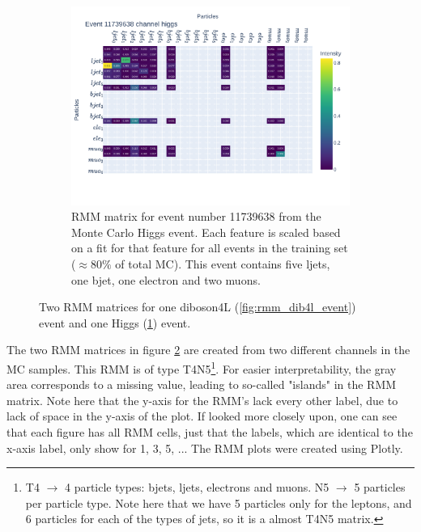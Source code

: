\begin{figure}[h!]
\begin{subfigure}{.8\textwidth}
        \includegraphics[width=\textwidth]{Figures/rmms/rmm_event_11739638_higgs.pdf}
        \caption{ RMM matrix for event number 11739638 from the Monte Carlo Higgs event. Each feature is scaled based on a fit for that feature for 
        all events in the training set ($\approx 80\%$ of total MC). This event contains five ljets, one bjet, one electron and two muons. }
        \label{fig:rmm_higgs_event}
    \end{subfigure}
    \hfill        
    \caption[Single event RMM plot]{Two RMM matrices for one diboson4L (\ref{fig:rmm_dib4l_event}) event and one Higgs (\ref{fig:rmm_higgs_event}) event.}
    \label{fig:rmm_singular_events}
\end{figure}

The two RMM matrices in figure \ref{fig:rmm_singular_events} are created from two different channels in the MC samples. 
This RMM is of type T4N5\footnote{T4 $\to$ 4 particle types: bjets, ljets, electrons and muons. N5 $\to$ 5 particles per 
particle type. Note here that we have 5 particles only for the leptons, and 6 particles for each of the types of jets, so it is a almost T4N5 matrix.}. 
 For easier interpretability, the gray area corresponds to a missing value, leading to so-called "islands" in the RMM matrix.
 Note here that the y-axis for the RMM's lack every other label, due to lack of space in the y-axis of the plot. If looked more 
 closely upon, one can see that each figure has all RMM cells, just that the labels, which are identical to the x-axis label, 
 only show for 1, 3, 5, ... The RMM plots were created using Plotly\cite{plotly}.


